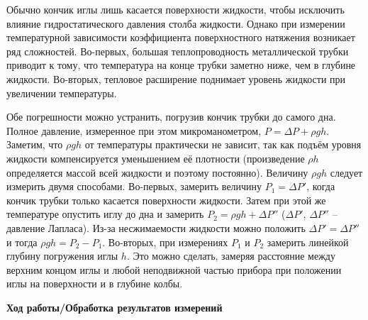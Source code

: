\documentclass[a4paper, 12pt]{article}
\begin{document}
    Обычно кончик иглы лишь касается поверхности жидкости, чтобы исключить влияние гидростатического давления столба жидкости. Однако при измерении температурной зависимости коэффициента поверхностного натяжения возникает ряд сложностей. Во-первых, большая теплопроводность металлической трубки приводит к тому, что температура на конце трубки заметно ниже, чем в глубине жидкости. Во-вторых, тепловое расширение поднимает уровень жидкости при увеличении температуры.
    
    Обе погрешности можно устранить, погрузив кончик трубки до самого дна. Полное давление, измеренное при этом микроманометром, $P = \Delta P + \rho g h$. Заметим, что $\rho g h$ от температуры практически не зависит, так как подъём уровня жидкости компенсируется уменьшением её плотности (произведение $\rho h$ определяется массой всей жидкости и поэтому постоянно). Величину $\rho g h$ следует измерить двумя способами. Во-первых, замерить величину $P_1 = \Delta P'$, когда кончик трубки только касается поверхности жидкости. Затем при этой же температуре опустить иглу до дна и замерить $P_2 = \rho g h + \Delta P''$ ($\Delta P'$, $\Delta P''$ – давление Лапласа). Из-за несжимаемости жидкости можно положить $\Delta P' = \Delta P''$ и тогда $\rho g h = P_2 - P_1$. Во-вторых, при измерениях $P_1$ и $P_2$ замерить линейкой глубину погружения иглы $h$. Это можно сделать, замеряя расстояние между верхним концом иглы и любой неподвижной частью прибора при положении иглы на поверхности и в глубине колбы.\\
    
    \begin{flushleft}
        {\Large {\bf Ход работы/Обработка результатов измерений}}
    \end{flushleft}
    
\end{document}
